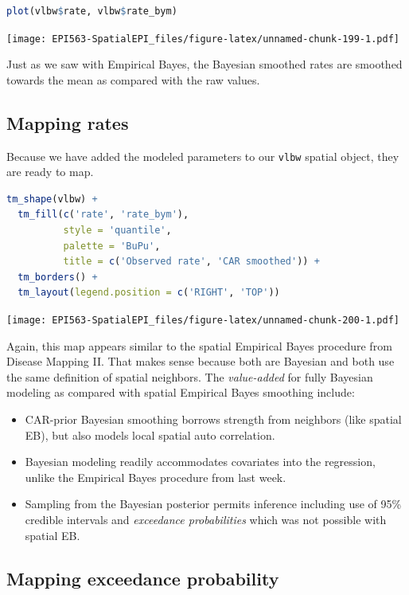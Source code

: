 \documentclass[
]{book}
\newcommand{\passthrough}[1]{#1}
\providecommand{\tightlist}{%
  \setlength{\itemsep}{0pt}\setlength{\parskip}{0pt}}
\begin{document}
\begin{lstlisting}[language=R]
plot(vlbw$rate, vlbw$rate_bym)
\end{lstlisting}

\texttt{[image: EPI563-SpatialEPI\_files/figure-latex/unnamed-chunk-199-1.pdf]}

Just as we saw with Empirical Bayes, the Bayesian smoothed rates are smoothed towards the mean as compared with the raw values.

\hypertarget{mapping-rates}{%
\subsection{Mapping rates}\label{mapping-rates}}

Because we have added the modeled parameters to our \passthrough{\lstinline!vlbw!} spatial object, they are ready to map.

\begin{lstlisting}[language=R]
tm_shape(vlbw) + 
  tm_fill(c('rate', 'rate_bym'),
          style = 'quantile',
          palette = 'BuPu',
          title = c('Observed rate', 'CAR smoothed')) +
  tm_borders() + 
  tm_layout(legend.position = c('RIGHT', 'TOP'))
\end{lstlisting}

\texttt{[image: EPI563-SpatialEPI\_files/figure-latex/unnamed-chunk-200-1.pdf]}

Again, this map appears similar to the spatial Empirical Bayes procedure from Disease Mapping II. That makes sense because both are Bayesian and both use the same definition of spatial neighbors. The \emph{value-added} for fully Bayesian modeling as compared with spatial Empirical Bayes smoothing include:

\begin{itemize}
\tightlist
\item
  CAR-prior Bayesian smoothing borrows strength from neighbors (like spatial EB), but also models local spatial auto correlation.
\item
  Bayesian modeling readily accommodates covariates into the regression, unlike the Empirical Bayes procedure from last week.
\item
  Sampling from the Bayesian posterior permits inference including use of 95\% credible intervals and \emph{exceedance probabilities} which was not possible with spatial EB.
\end{itemize}

\hypertarget{mapping-exceedance-probability}{%
\subsection{Mapping exceedance probability}\label{mapping-exceedance-probability}}
\end{document}
